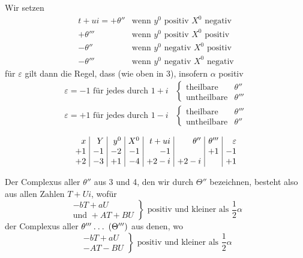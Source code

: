%
Wir setzen
\[
\begin{array}{rl}
t+ui=+\theta''&\text{wenn }y^0\text{ positiv }X^0\text{ negativ}\\
+\theta'''&\text{wenn }y^0\text{ positiv }X^0\text{ positiv}\\
-\theta''&\text{wenn }y^0\text{ negativ }X^0\text{ positiv}\\
-\theta'''&\text{wenn }y^0\text{ negativ }X^0\text{ negativ}
\end{array}
\]
für $\varepsilon$ gilt dann die Regel, dass (wie oben in 3), insofern $\alpha$ positiv
\[
\begin{aligned}
\varepsilon=-1\text{ für jedes durch }1+i&\left\{\begin{array}{ll}\text{theilbare}&\theta''\\\text{untheilbare}&\theta'''\end{array}\right.\\[3pt]
\varepsilon=+1\text{ für jedes durch }1-i&\left\{\begin{array}{ll}\text{theilbare}&\theta'''\\\text{untheilbare}&\theta''\end{array}\right.
\end{aligned}
\]

\[
\setlength{\arraycolsep}{4pt}
\begin{array}{r|r|r|r|r|r|r|r}
x&Y&y^0&X^0&t+ui&\theta''&\theta'''&\varepsilon\\
+1&-1&-2&-1&-1&&+1&-1\\
+2&-3&+1&-4&+2-i&+2-i&&+1
\end{array}
\]

Der Complexus aller $\theta''$ aus 3 und 4, den wir durch $\Theta''$ bezeichnen, besteht also aus allen Zahlen $T+Ui$, wofür
\[
\left.\begin{array}{r}
-bT+aU\\
\text{und }+AT+BU
\end{array}\right\}\text{ positiv und kleiner als }\frac12\alpha
\]
der Complexus aller $\theta'''\mathbin{.}\mathbin{.}\mathbin{.}\;(\Theta''')$ aus denen, wo
\[
\left.\begin{array}{r}
-bT+aU\\
-AT-BU
\end{array}\right\}\text{ positiv und kleiner als }\frac12\alpha
\]

